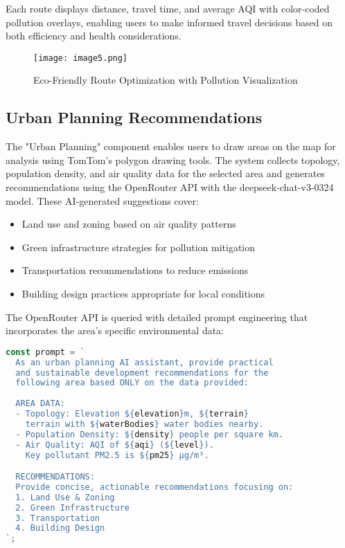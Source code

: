 \documentclass[conference]{IEEEtran}
\begin{document}
Each route displays distance, travel time, and average AQI with color-coded pollution overlays, enabling users to make informed travel decisions based on both efficiency and health considerations.

\begin{figure}[htbp]
    \centering
    \texttt{[image: image5.png]}
    \caption{Eco-Friendly Route Optimization with Pollution Visualization}
    \label{fig:route-optimization}
\end{figure}

\subsection{Urban Planning Recommendations}
The "Urban Planning" component enables users to draw areas on the map for analysis using TomTom's polygon drawing tools. The system collects topology, population density, and air quality data for the selected area and generates recommendations using the OpenRouter API with the deepseek-chat-v3-0324 model. These AI-generated suggestions cover:
\begin{itemize}
    \item Land use and zoning based on air quality patterns
    \item Green infrastructure strategies for pollution mitigation
    \item Transportation recommendations to reduce emissions
    \item Building design practices appropriate for local conditions
\end{itemize}

The OpenRouter API is queried with detailed prompt engineering that incorporates the area's specific environmental data:

\begin{lstlisting}[language=JavaScript]
const prompt = `
  As an urban planning AI assistant, provide practical 
  and sustainable development recommendations for the 
  following area based ONLY on the data provided:
  
  AREA DATA:
  - Topology: Elevation ${elevation}m, ${terrain} 
    terrain with ${waterBodies} water bodies nearby.
  - Population Density: ${density} people per square km.
  - Air Quality: AQI of ${aqi} (${level}). 
    Key pollutant PM2.5 is ${pm25} μg/m³.

  RECOMMENDATIONS:
  Provide concise, actionable recommendations focusing on:
  1. Land Use & Zoning
  2. Green Infrastructure
  3. Transportation
  4. Building Design
`;
\end{lstlisting}
\end{document}
